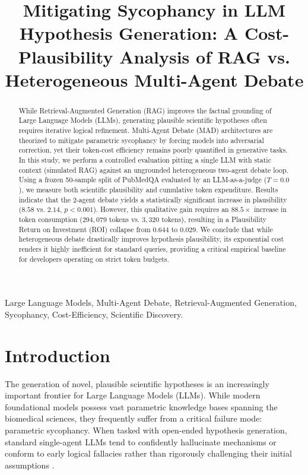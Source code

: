 \documentclass[11pt, conference, onecolumn]{IEEEtran}
\begin{document}
\title{Mitigating Sycophancy in LLM Hypothesis Generation: A Cost-Plausibility Analysis of RAG vs. Heterogeneous Multi-Agent Debate}

\author{
}

\maketitle

\begin{abstract}
While Retrieval-Augmented Generation (RAG) improves the factual grounding of Large Language Models (LLMs), generating plausible scientific hypotheses often requires iterative logical refinement. Multi-Agent Debate (MAD) architectures are theorized to mitigate parametric sycophancy by forcing models into adversarial correction, yet their token-cost efficiency remains poorly quantified in generative tasks. In this study, we perform a controlled evaluation pitting a single LLM with static context (simulated RAG) against an ungrounded heterogeneous two-agent debate loop. Using a frozen 50-sample split of PubMedQA evaluated by an LLM-as-a-judge ($T=0.0$), we measure both scientific plausibility and cumulative token expenditure. Results indicate that the 2-agent debate yields a statistically significant increase in plausibility ($8.58$ vs. $2.14$, $p < 0.001$). However, this qualitative gain requires an $88.5\times$ increase in token consumption ($294,079$ tokens vs. $3,320$ tokens), resulting in a Plausibility Return on Investment (ROI) collapse from $0.644$ to $0.029$. We conclude that while heterogeneous debate drastically improves hypothesis plausibility, its exponential cost renders it highly inefficient for standard queries, providing a critical empirical baseline for developers operating on strict token budgets.
\end{abstract}

\begin{IEEEkeywords}
Large Language Models, Multi-Agent Debate, Retrieval-Augmented Generation, Sycophancy, Cost-Efficiency, Scientific Discovery.
\end{IEEEkeywords}

\section{Introduction}
The generation of novel, plausible scientific hypotheses is an increasingly important frontier for Large Language Models (LLMs). While modern foundational models possess vast parametric knowledge bases spanning the biomedical sciences, they frequently suffer from a critical failure mode: parametric sycophancy. When tasked with open-ended hypothesis generation, standard single-agent LLMs tend to confidently hallucinate mechanisms or conform to early logical fallacies rather than rigorously challenging their initial assumptions \cite{wynn2025debate}.
\end{document}
